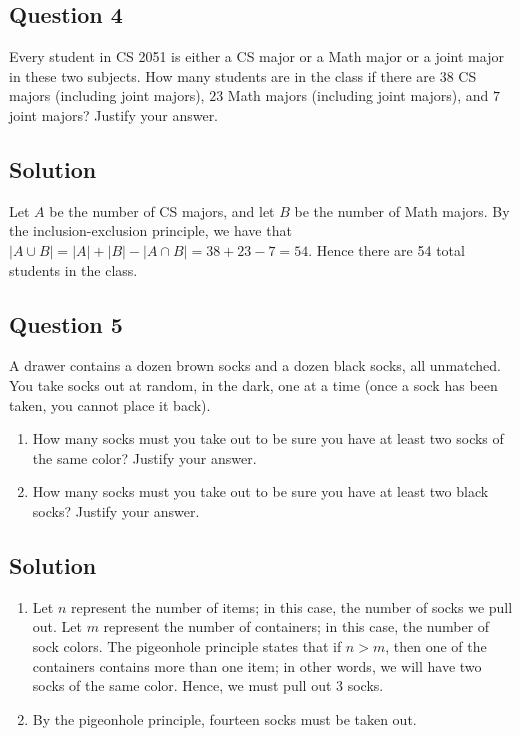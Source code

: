 \documentclass{article}
\begin{document}
\subsection*{Question 4}
    Every student in CS 2051 is either a CS major or a Math major or a joint major in these two subjects. How many students are in the class if there are $38$ CS majors (including joint majors), $23$ Math majors (including joint majors), and $7$ joint majors? Justify your answer.
    
\subsection*{Solution}
    Let $A$ be the number of CS majors, and let $B$ be the number of Math majors. By the inclusion-exclusion principle, we have that 
    $|A \cup B| = |A| + |B| - |A \cap B| = 38 + 23 - 7 = 54$. Hence there are 54 total students in the class.

\subsection*{Question 5}
    A drawer contains a dozen brown socks and a dozen black socks, all unmatched. You take socks out at random, in the dark, one at a time (once a sock has been taken, you cannot place it back).
    \begin{enumerate}
        \item How many socks must you take out to be sure you have at least two socks of the same color? Justify your answer.
        \item How many socks must you take out to be sure you have at least two black socks? Justify your answer.
    \end{enumerate}

\subsection*{Solution}
    \begin{enumerate}
        \item Let $n$ represent the number of items; in this case, the number of socks we pull out. Let $m$ represent the number of containers; in this case, the number of sock colors. The pigeonhole principle states that if $n > m$, then one of the containers contains more than one item; in other words, we will have two socks of the same color. Hence, we must pull out $3$ socks.
        \item By the pigeonhole principle, fourteen socks must be taken out.
    \end{enumerate}
\end{document}
